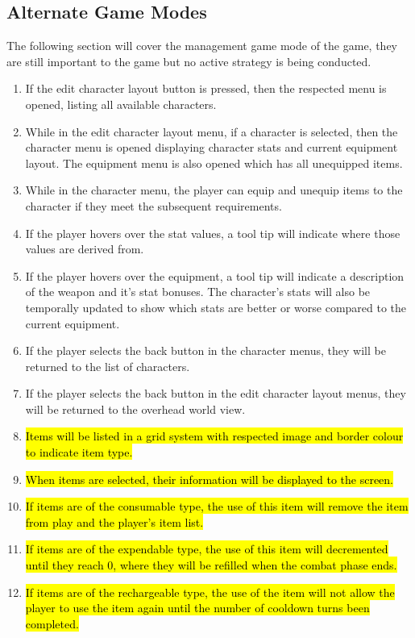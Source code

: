 \documentclass{article}
\begin{document}
\subsection{Alternate Game Modes}
\quad The following section will cover the management game mode of the game, they are still important to the game but no active strategy is being conducted.
\begin{enumerate}[{AGR}1. ]
	\item If the edit character layout button is pressed, then the respected menu is opened, listing all available characters.
	\item While in the edit character layout menu, if a character is selected, then the character menu is opened displaying character stats and current equipment layout. The equipment menu is also opened which has all unequipped items.
	\item While in the character menu, the player can equip and unequip items to the character if they meet the subsequent requirements.
	\item If the player hovers over the stat values, a tool tip will indicate where those values are derived from.
	\item If the player hovers over the equipment, a tool tip will indicate a description of the weapon and it's stat bonuses. The character's stats will also be temporally updated to show which stats are better or worse compared to the current equipment.
	\item If the player selects the back button in the character menus, they will be returned to the list of characters.
	\item  If the player selects the back button in the edit character layout menus, they will be returned to the overhead world view.
	\item \hl{Items will be listed in a grid system with respected image and border colour to indicate item type.}
	\item \hl{When items are selected, their information will be displayed to the screen.}
	\item \hl{If items are of the consumable type, the use of this item will remove the item from play and the player's item list.}
	\item \hl{If items are of the expendable type, the use of this item will decremented until they reach 0, where they will be refilled when the combat phase ends.}
	\item \hl{If items are of the rechargeable type, the use of the item will not allow the player to use the item again until the number of cooldown turns been completed.}

\end{enumerate}
\end{document}
